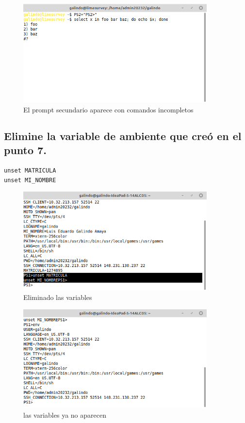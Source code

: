 \documentclass[11pt]{article}
\begin{document}
\begin{figure}[htbp]
\centering
\includegraphics[width=10cm]{img/8.png}
\caption{El prompt secundario aparece con comandos incompletos \autocite{0003_P}}
\end{figure}
\pagebreak

\subsection{Elimine la variable de ambiente que creó en el punto 7.}
\label{sec:org75df835}
\begin{verbatim}
unset MATRICULA
unset MI_NOMBRE
\end{verbatim}

\begin{figure}[htbp]
\centering
\includegraphics[width=10cm]{img/9.png}
\caption{Eliminado las variables}
\end{figure}

\begin{figure}[htbp]
\centering
\includegraphics[width=10cm]{img/9b.png}
\caption{las variables ya no aparecen}
\end{figure}
\end{document}
